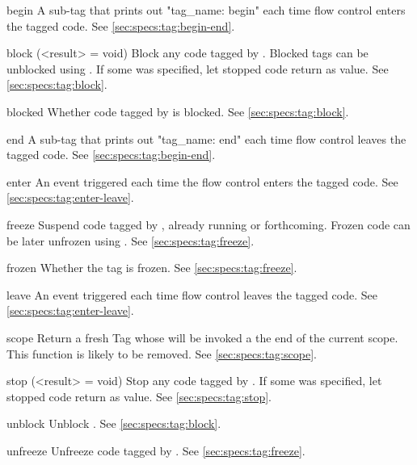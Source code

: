 \begin{urbiscriptapi}
\item[begin]
  A sub-tag that prints out "tag\_name: begin" each time flow control
  enters the tagged code. See \autoref{sec:specs:tag:begin-end}.


\item[block](<result> = void)%
  Block any code tagged by \this.  Blocked tags can be
  unblocked using .  If some  was
  specified, let stopped code return  as value.  See
  \autoref{sec:specs:tag:block}.


\item[blocked]
  Whether code tagged by \this is blocked.  See
  \autoref{sec:specs:tag:block}.


\item[end]
  A sub-tag that prints out "tag\_name: end" each time flow control
  leaves the tagged code. See \autoref{sec:specs:tag:begin-end}.


\item[enter] An event triggered each time the flow control enters the
  tagged code.  See \autoref{sec:specs:tag:enter-leave}.


\item[freeze] Suspend code tagged by \this, already running or
  forthcoming.  Frozen code can be later unfrozen using .
  See \autoref{sec:specs:tag:freeze}.


\item[frozen]
  Whether the tag is frozen. See  \autoref{sec:specs:tag:freeze}.


\item[leave] An event triggered each time flow control leaves the
  tagged code.  See \autoref{sec:specs:tag:enter-leave}.


\item[scope] Return a fresh Tag whose  will be invoked a the
  end of the current scope.  This function is likely to be removed.  See
  \autoref{sec:specs:tag:scope}.


\item[stop](<result> = void)%
  Stop any code tagged by \this.  If some  was
  specified, let stopped code return  as value.
  See \autoref{sec:specs:tag:stop}.

\item[unblock]
  Unblock \this.  See \autoref{sec:specs:tag:block}.


\item[unfreeze]
  Unfreeze code tagged by \this.  See
  \autoref{sec:specs:tag:freeze}.
\end{urbiscriptapi}


